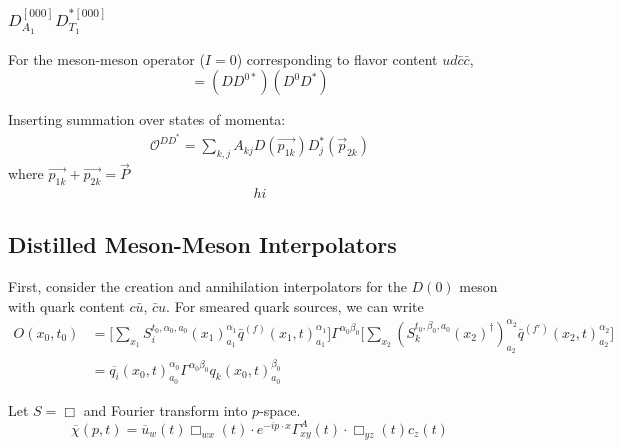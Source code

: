 \begin{table}
\subsubsection{$D^{[000]}_{A_1}D^{*[000]}_{T_1}$}
For the meson-meson operator ($I=0$) corresponding to flavor content $ud\bar{c}\bar{c}$,
    \begin{equation}
    [(M_1M_2^*)(M_2M_1^*)] = (DD^{0*})(D^0D^*)
    \end{equation}

Inserting summation over states of momenta:
\begin{align}
    \mathcal{O}^{DD^*} = \sum_{k,j} A_{kj} D(\vec{p_{1k}})D_j^*(\vec{p}_{2k}) 
\end{align} where $\vec{p_{1k}} + \vec{p_{2k}} = \vec{P}$
\begin{align}
hi
\end{align}


\subsection{Distilled Meson-Meson Interpolators}

First, consider the creation and annihilation interpolators for the \(D(0)\) meson with quark content \(c\bar{u}\), \(\bar{c}u\). For smeared quark sources, we can write 
\begin{align}
    O(x_0,t_0) &= \Bigg[\sum_{x_1} S_i^{t_0,\alpha_0,a_0}(x_1)^{\alpha_1}_{a_1}\bar{q}^{(f)}(x_1,t)^{\alpha_1}_{a_1}\Bigg] \Gamma^{\alpha_0\beta_0} \Bigg[\sum_{x_2} (S_k^{t_0,\beta_0,a_0}(x_2)^\dagger)^{\alpha_2}_{a_2}\bar{q}^{(f')}(x_2,t)^{\alpha_2}_{a_2}\Bigg] \\
    &= \overline{q_i}(x_0, t)^{\alpha_0}_{a_0} \Gamma^{\alpha_0\beta_0} q_k(x_0,t)^{\beta_0}_{a_0}
\end{align}

Let \(S = \Box\) and Fourier transform into \(p\)-space. 
\[
\overline{\chi}(p, t) = \overline{u}_w(t) \Box_{wx}(t) \cdot e^{-ip\cdot x} \Gamma^A_{xy}(t) \cdot \Box_{yz}(t) c_z(t)
\]


\end{table}
